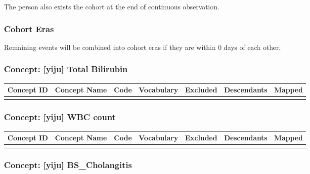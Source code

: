 \documentclass[
  12pt,
]{article}
\begin{document}
The person also exists the cohort at the end of continuous observation.

\subsubsection{Cohort Eras}\label{cohort-eras-4}

Remaining events will be combined into cohort eras if they are within 0 days of each other.

\subsubsection{Concept: {[}yiju{]} Total Bilirubin}\label{concept-yiju-total-bilirubin-2}

\begingroup\fontsize{8}{10}\selectfont

\begin{longtable}{>{\raggedright\arraybackslash}p{5em}>{\raggedright\arraybackslash}p{20em}lllll}
\toprule
Concept ID & Concept Name & Code & Vocabulary & Excluded & Descendants & Mapped\\
\midrule
\cellcolor{gray!10}{3024128} & \cellcolor{gray!10}{Bilirubin.total [Mass/volume] in Serum or Plasma} & \cellcolor{gray!10}{1975-2} & \cellcolor{gray!10}{LOINC} & \cellcolor{gray!10}{NO} & \cellcolor{gray!10}{NO} & \cellcolor{gray!10}{NO}\\
\bottomrule
\end{longtable}
\endgroup{}

\subsubsection{Concept: {[}yiju{]} WBC count}\label{concept-yiju-wbc-count-2}

\begingroup\fontsize{8}{10}\selectfont

\begin{longtable}{>{\raggedright\arraybackslash}p{5em}>{\raggedright\arraybackslash}p{20em}lllll}
\toprule
Concept ID & Concept Name & Code & Vocabulary & Excluded & Descendants & Mapped\\
\midrule
\cellcolor{gray!10}{3000905} & \cellcolor{gray!10}{Leukocytes [\#/volume] in Blood by Automated count} & \cellcolor{gray!10}{6690-2} & \cellcolor{gray!10}{LOINC} & \cellcolor{gray!10}{NO} & \cellcolor{gray!10}{NO} & \cellcolor{gray!10}{NO}\\
\bottomrule
\end{longtable}
\endgroup{}

\subsubsection{Concept: {[}yiju{]} BS\_Cholangitis}\label{concept-yiju-bs_cholangitis}
\end{document}

